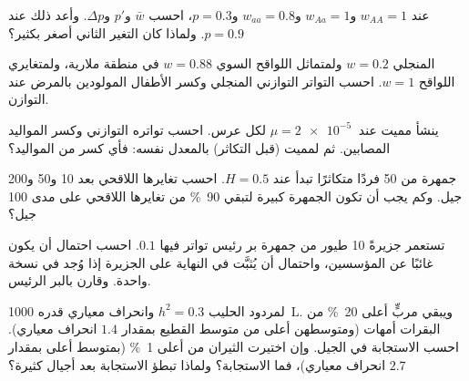 \begin{exercise}[$\star\star$]\label{exo:b2:population-genetics:6}
عند $w_{AA} = 1$ و$w_{Aa} = 1$ و$w_{aa} = 0.8$ و$p = 0.3$، احسب
$\bar w$ و$p'$ و$\Delta p$. وأعد ذلك عند $p = 0.9$. ولماذا كان
التغير الثاني أصغر بكثير؟
\end{exercise}

\begin{exercise}[$\star\star$]\label{exo:b2:population-genetics:7}
 المنجلي $w = 0.2$ ولمتماثل اللواقح السوي
$w = 0.88$ في منطقة ملارية، ولمتغايري اللواقح $w = 1$. احسب
التواتر التوازني  المنجلي وكسر
الأطفال المولودين بالمرض عند التوازن.
\end{exercise}

\begin{exercise}[$\star\star$]\label{exo:b2:population-genetics:8}
ينشأ  مميت  عند $\mu = \qty{2e-5}{}$ لكل
عرس. احسب تواتره التوازني وكسر
المواليد المصابين. ثم لمميت  (قبل التكاثر) بالمعدل
نفسه: فأي كسر من المواليد؟
\end{exercise}

\begin{exercise}[$\star\star$]\label{exo:b2:population-genetics:9}
جمهرة من 50 فردًا متكاثرًا تبدأ عند $H = 0.5$.
احسب تغايرها اللاقحي بعد 10 و50 و200 جيل. وكم
يجب أن تكون الجمهرة كبيرة لتبقي \qty{90}{\%} من
تغايرها اللاقحي على مدى 100 جيل؟
\end{exercise}

\begin{exercise}[$\star\star\star$]\label{exo:b2:population-genetics:10}
تستعمر جزيرةً 10 طيور من جمهرة بر رئيس
تواتر  فيها $0.1$. احسب احتمال أن
يكون  غائبًا عن المؤسسين، واحتمال أن
يُثبَّت في النهاية على الجزيرة إذا وُجد في نسخة واحدة.
وقارن بالبر الرئيس.
\end{exercise}

\begin{exercise}[$\star\star\star$]\label{exo:b2:population-genetics:11}
لمردود الحليب $h^{2} = 0.3$ وانحراف معياري قدره
\qty{1000}{L}. ويبقي مربٍّ أعلى \qty{20}{\%} من البقرات
أمهات (ومتوسطهن أعلى من متوسط القطيع بمقدار $1.4$ انحراف معياري).
احسب الاستجابة في الجيل. وإن اختيرت الثيران من
أعلى \qty{1}{\%} (بمتوسط أعلى بمقدار $2.7$ انحراف معياري)، فما
الاستجابة؟ ولماذا تبطؤ الاستجابة بعد أجيال كثيرة؟
\end{exercise}

